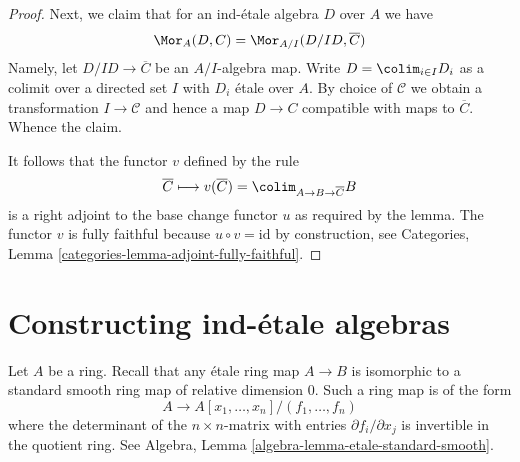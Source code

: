 \begin{proof}
\medskip\noindent
Next, we claim that for an ind-\'etale algebra $D$ over $A$ we have
$$
\Mor_A(D, C) = \Mor_{A/I}(D/ID, \overline{C})
$$
Namely, let $D/ID \to \overline{C}$ be an $A/I$-algebra map.
Write $D = \colim_{i \in I} D_i$ as a colimit over a directed set $I$
with $D_i$ \'etale over $A$. By choice of $\mathcal{C}$
we obtain a transformation $I \to \mathcal{C}$ and hence a map
$D \to C$ compatible with maps to $\overline{C}$. Whence the claim.

\medskip\noindent
It follows that the functor $v$ defined by the rule
$$
\overline{C} 
\longmapsto
v(\overline{C}) = \colim_{A \to B \to \overline{C}} B
$$
is a right adjoint to the base change functor $u$ as required by the lemma.
The functor $v$ is fully faithful because
$u \circ v = \text{id}$ by construction, see
Categories, Lemma \ref{categories-lemma-adjoint-fully-faithful}.
\end{proof}









\section{Constructing ind-\'etale algebras}
\label{section-construction-ind-etale}

\noindent
Let $A$ be a ring. Recall that any \'etale ring map $A \to B$ is isomorphic
to a standard smooth ring map of relative dimension $0$. Such a ring map
is of the form
$$
A \longrightarrow A[x_1, \ldots, x_n]/(f_1, \ldots, f_n)
$$
where the determinant of the $n \times n$-matrix with entries
$\partial f_i/\partial x_j$ is invertible in the quotient ring. See
Algebra, Lemma \ref{algebra-lemma-etale-standard-smooth}.

